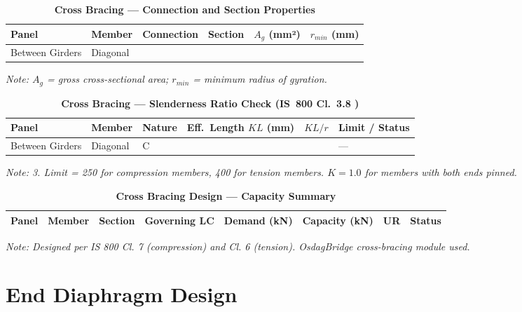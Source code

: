 \documentclass[12pt,a4paper]{report}
\numberwithin{table}{chapter}
\numberwithin{figure}{chapter}
\begin{document}
\vspace{1em}

\vspace{0.4em}
\noindent
\setlength{\tabcolsep}{4pt}
\setlength\LTleft{0pt}
\setlength\LTright{\fill}

\begin{longtable}{|C{2.0cm}|L{2.0cm}|L{2.2cm}|C{2.5cm}|C{2.0cm}|C{2.0cm}|}
\caption{\textbf{Cross Bracing --- Connection and Section Properties}}
\hline
\textbf{Panel} & \textbf{Member} & \textbf{Connection} & \textbf{Section} & \textbf{$A_g$ (mm²)} & \textbf{$r_{min}$ (mm)} \\[6pt]
\hline
Between Girders & Diagonal &  &  &  &  \\[6pt]
\hline
\end{longtable}
\noindent\textit{Note: $A_g$ = gross cross-sectional area; $r_{min}$ = minimum radius of gyration.}

\vspace{1em}
\begin{longtable}{|C{2.2cm}|L{2.2cm}|L{2.5cm}|C{2.5cm}|C{2.5cm}|>{\centering\arraybackslash}p{3.6cm}|}
\caption{\textbf{Cross Bracing --- Slenderness Ratio Check (IS~800 Cl.~3.8 )}}
\hline
\textbf{Panel} & \textbf{Member} & \textbf{Nature} & \textbf{Eff.\ Length $KL$ (mm)} & \textbf{$KL/r$} & \textbf{Limit / Status} \\[6pt]
\hline
Between Girders & Diagonal & C &  &  &  ---  \\[6pt]
\hline
\end{longtable}
\noindent\textit{Note:  3. Limit = 250 for compression members, 400 for tension members. $K = 1.0$ for members with both ends pinned.}

\vspace{1em}
\begin{longtable}{|C{2.0cm}|L{1.8cm}|C{2.2cm}|C{3.0cm}|C{1.8cm}|C{1.8cm}|C{1.2cm}|C{1.8cm}|}
\caption{\textbf{Cross Bracing Design --- Capacity Summary}}
\hline
\textbf{Panel} & \textbf{Member} & \textbf{Section} & \textbf{Governing LC} & \textbf{Demand (kN)} & \textbf{Capacity (kN)} & \textbf{UR} & \textbf{Status} \\[6pt]
\hline

\end{longtable}
\noindent\textit{Note: Designed per IS 800 Cl. 7 (compression) and Cl. 6 (tension). OsdagBridge cross-bracing module used.}

\section{End Diaphragm Design}
\label{sec:end-diaphragm}
\end{document}
